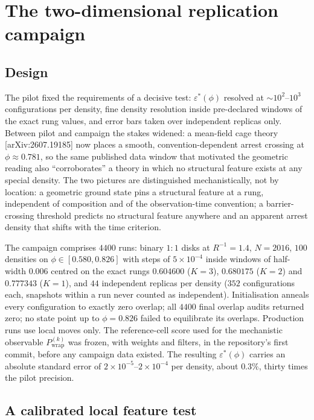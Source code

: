 \documentclass[aps,prl,twocolumn,superscriptaddress,floatfix]{revtex4-2}
\begin{document}
\section{The two-dimensional replication campaign}
\label{sec:campaign}

\subsection{Design}

The pilot fixed the requirements of a decisive test: $\varepsilon^*(\phi)$
resolved at $\sim10^2$--$10^3$ configurations per density, fine density
resolution inside pre-declared windows of the exact rung values, and error
bars taken over independent replicas only. Between pilot and campaign the
stakes widened: a mean-field cage theory [arXiv:2607.19185] now places a
smooth, convention-dependent arrest crossing at $\phi\approx0.781$, so the
same published data window that motivated the geometric reading also
``corroborates'' a theory in which no structural feature exists at any
special density. The two pictures are distinguished mechanistically, not by
location: a geometric ground state pins a structural feature at a rung,
independent of composition and of the observation-time convention; a
barrier-crossing threshold predicts no structural feature anywhere and an
apparent arrest density that shifts with the time criterion.

The campaign comprises $4400$ runs: binary $1{:}1$ disks at $R^{-1}=1.4$,
$N=2016$, $100$ densities on $\phi\in[0.580,0.826]$ with steps of
$5\times10^{-4}$ inside windows of half-width $0.006$ centred on the exact
rungs $0.604600$ ($K{=}3$), $0.680175$ ($K{=}2$) and $0.777343$ ($K{=}1$),
and $44$ independent replicas per density ($352$ configurations each,
snapshots within a run never counted as independent). Initialisation anneals
every configuration to exactly zero overlap; all $4400$ final overlap audits
returned zero; no state point up to $\phi=0.826$ failed to equilibrate its
overlaps. Production runs use local moves only. The reference-cell score
used for the mechanistic observable $P^{(k)}_{\mathrm{wrap}}$ was frozen,
with weights and filters, in the repository's first commit, before any
campaign data existed. The resulting $\varepsilon^*(\phi)$ carries an
absolute standard error of $2\times10^{-5}$--$2\times10^{-4}$ per density,
about $0.3\%$, thirty times the pilot precision.

\subsection{A calibrated local feature test}
\end{document}
